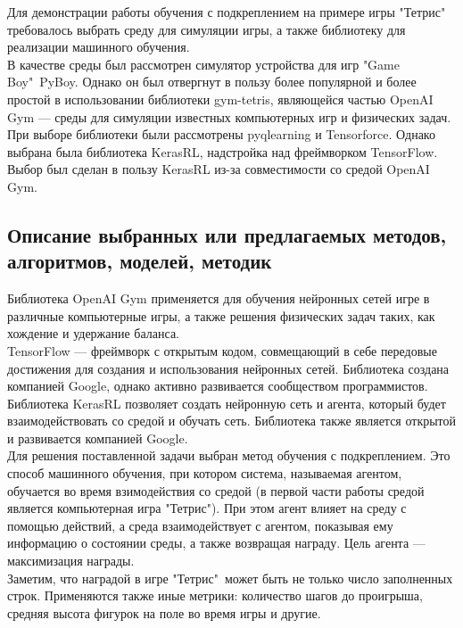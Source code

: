 \documentclass{article}
\begin{document}
Для демонстрации работы обучения с подкреплением на примере игры "Тетрис" требовалось выбрать среду для симуляции игры, а также библиотеку для реализации машинного обучения.\\
В качестве среды был рассмотрен симулятор устройства для игр "Game Boy"\ PyBoy\cite{litlink11}. Однако он был отвергнут в пользу более популярной и более простой в использовании библиотеки gym-tetris\cite{litlink12}, являющейся частью OpenAI Gym\cite{litlink13} — среды для симуляции известных компьютерных игр и физических задач.\\
При выборе библиотеки были рассмотрены pyqlearning\cite{litlink14} и Tensorforce\cite{litlink15}. Однако выбрана была библиотека KerasRL\cite{litlink16}, надстройка над фреймворком TensorFlow\cite{litlink17}. Выбор был сделан в пользу KerasRL из-за совместимости со средой OpenAI Gym.
\newpage
\begin{center}
\section {Описание выбранных или предлагаемых методов, алгоритмов, моделей, методик}
\end{center}
Библиотека OpenAI Gym применяется для обучения нейронных сетей игре в различные компьютерные игры, а также решения физических задач таких, как хождение и удержание баланса. \\
TensorFlow — фреймворк с открытым кодом, совмещающий в себе передовые достижения для создания и использования нейронных сетей. Библиотека создана компанией Google, однако активно развивается сообществом программистов\cite{litlink18}.\\
Библиотека KerasRL позволяет создать нейронную сеть и агента, который будет взаимодействовать со средой и обучать сеть. Библиотека также является открытой и развивается компанией Google.\\
Для решения поставленной задачи выбран метод обучения с подкреплением. Это способ машинного обучения, при котором система, называемая агентом, обучается во время взимодействия со средой (в первой части работы средой является компьютерная игра "Тетрис"). При этом агент влияет на среду с помощью действий, а среда взаимодействует с агентом, показывая ему информацию о состоянии среды, а также возвращая награду. Цель агента — максимизация награды.\\
Заметим, что наградой в игре "Тетрис"\ может быть не только число заполненных строк. Применяются также иные метрики: количество шагов до проигрыша, средняя высота фигурок на поле во время игры и другие.\\
\end{document}
